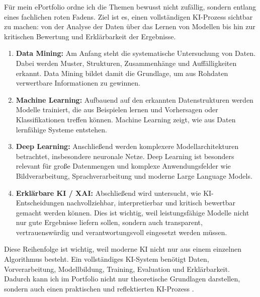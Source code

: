 \documentclass[12pt,a4paper]{article}
\begin{document}
Für mein ePortfolio ordne ich die Themen bewusst nicht zufällig, sondern entlang eines fachlichen roten Fadens. Ziel ist es, einen vollständigen KI-Prozess sichtbar zu machen: von der Analyse der Daten über das Lernen von Modellen bis hin zur kritischen Bewertung und Erklärbarkeit der Ergebnisse.

\begin{enumerate}
\item \textbf{Data Mining:} Am Anfang steht die systematische Untersuchung von Daten. Dabei werden Muster, Strukturen, Zusammenhänge und Auffälligkeiten erkannt. Data Mining bildet damit die Grundlage, um aus Rohdaten verwertbare Informationen zu gewinnen.


\item \textbf{Machine Learning:} Aufbauend auf den erkannten Datenstrukturen werden Modelle trainiert, die aus Beispielen lernen und Vorhersagen oder Klassifikationen treffen können. Machine Learning zeigt, wie aus Daten lernfähige Systeme entstehen.

\item \textbf{Deep Learning:} Anschließend werden komplexere Modellarchitekturen betrachtet, insbesondere neuronale Netze. Deep Learning ist besonders relevant für große Datenmengen und komplexe Anwendungsfelder wie Bildverarbeitung, Sprachverarbeitung und moderne Large Language Models.

\item \textbf{Erklärbare KI / XAI:} Abschließend wird untersucht, wie KI-Entscheidungen nachvollziehbar, interpretierbar und kritisch bewertbar gemacht werden können. Dies ist wichtig, weil leistungsfähige Modelle nicht nur gute Ergebnisse liefern sollen, sondern auch transparent, vertrauenswürdig und verantwortungsvoll eingesetzt werden müssen.

\end{enumerate}

Diese Reihenfolge ist wichtig, weil moderne KI nicht nur aus einem einzelnen Algorithmus besteht. Ein vollständiges KI-System benötigt Daten, Vorverarbeitung, Modellbildung, Training, Evaluation und Erklärbarkeit. Dadurch kann ich im Portfolio nicht nur theoretische Grundlagen darstellen, sondern auch einen praktischen und reflektierten KI-Prozess .
\end{document}

